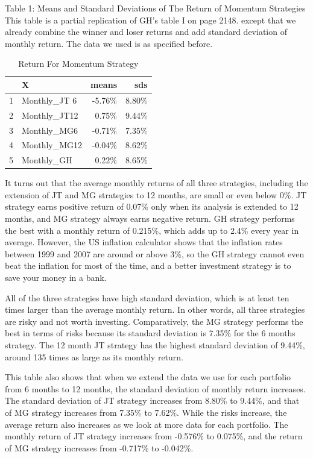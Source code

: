 \documentclass{article}
\begin{document}
\begin{center}
Table 1: Means and Standard Deviations of The Return of Momentum Strategies
\small This table is a partial replication of GH's table I on page 2148. except that we already combine the winner and loser returns and add standard deviation of monthly return. The data we used is as specified before. 

\begin{table}[ht]
    \centering
    \begin{tabular}{rlrr}
 \hline
 & X & means & sds \\ 
  \hline
1 & Monthly\_JT 6 & -5.76\% & 8.80\% \\ 
  2 & Monthly\_JT12 & 0.75\% & 9.44\% \\ 
  3 & Monthly\_MG6 & -0.71\% & 7.35\% \\ 
  4 & Monthly\_MG12 & -0.04\% & 8.62\% \\ 
  5 & Monthly\_GH & 0.22\% & 8.65\% \\ 
   \hline
\end{tabular}
\caption{Return For Momentum Strategy} 
\end{table}

\end{center}

It turns out that the average monthly returns of all three strategies, including the extension of JT and MG strategies to 12 months, are small or even below 0\%. JT strategy earns positive return of 0.07\% only when its analysis is extended to 12 months, and MG strategy always earns negative return. GH strategy performs the best with a monthly return of 0.215\%, which adds up to 2.4\% every year in average. However, the US inflation calculator shows that the inflation rates between 1999 and 2007 are around or above 3\%, so the GH strategy cannot even beat the inflation for most of the time, and a better investment strategy is to save your money in a bank.

All of the three strategies have high standard deviation, which is at least ten times larger than the average monthly return. In other words, all three strategies are risky and not worth investing. Comparatively, the MG strategy performs the best in terms of risks because its standard deviation is 7.35\% for the 6 months strategy. The 12 month JT strategy has the highest standard deviation of 9.44\%, around 135 times as large as its monthly return.

This table also shows that when we extend the data we use for each portfolio from 6 months to 12 months, the standard deviation of monthly return increases. The standard deviation of JT strategy increases from 8.80\% to 9.44\%, and that of MG strategy increases from 7.35\% to 7.62\%. While the risks increase, the average return also increases as we look at more data for each portfolio. The monthly return of JT strategy increases from -0.576\% to 0.075\%, and the return of MG strategy increases from -0.717\% to -0.042\%. 
\end{document}
